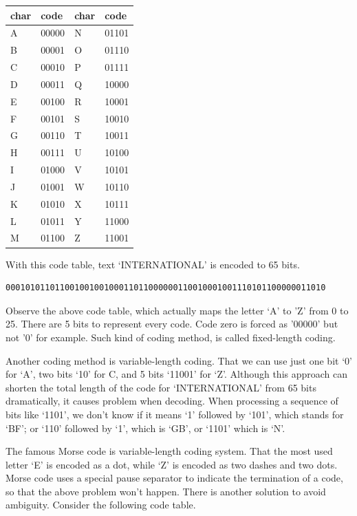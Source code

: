 \documentclass[UTF8]{article}
\begin{document}
\begin{tabular}{l|l||l|l}
char & code & char & code \\
\hline
A & 00000 & N & 01101 \\
B & 00001 & O & 01110 \\
C & 00010 & P & 01111 \\
D & 00011 & Q & 10000 \\
E & 00100 & R & 10001 \\
F & 00101 & S & 10010 \\
G & 00110 & T & 10011 \\
H & 00111 & U & 10100 \\
I & 01000 & V & 10101 \\
J & 01001 & W & 10110 \\
K & 01010 & X & 10111 \\
L & 01011 & Y & 11000 \\
M & 01100 & Z & 11001 \\
\hline
\end{tabular}

With this code table, text `INTERNATIONAL' is encoded to 65 bits.

\begin{verbatim}
00010101101100100100100011011000000110010001001110101100000011010
\end{verbatim}

Observe the above code table, which actually maps the letter `A' to 'Z' from
0 to 25. There are 5 bits to represent every code. Code zero is forced
as '00000' but not '0' for example. Such kind of coding method, is called
fixed-length coding.

Another coding method is variable-length coding. That we can use just one bit `0'
for `A', two bits `10' for C, and 5 bits `11001' for `Z'. Although this approach
can shorten the total length of the code for `INTERNATIONAL' from 65 bits
dramatically, it causes problem when decoding. When processing a sequence of
bits like `1101', we don't know if it means `1' followed by `101', which stands
for `BF'; or `110' followed by `1', which is `GB', or `1101' which is `N'.

The famous Morse code is variable-length coding system. That the most used letter `E'
is encoded as a dot, while `Z' is encoded as two dashes and two dots. Morse code
uses a special pause separator to indicate the termination of a code, so that
the above problem won't happen. There is another solution to avoid ambiguity.
Consider the following code table.
\end{document}
